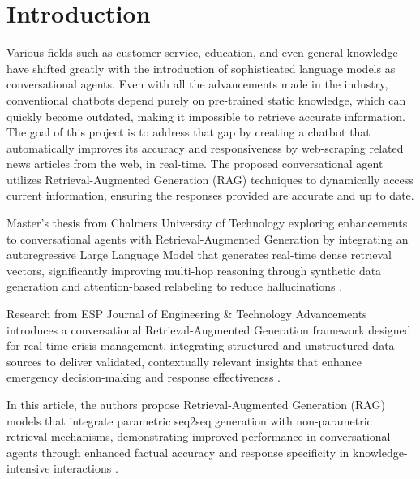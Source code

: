 \documentclass[fleqn,moreauthors,10pt]{ds_report}
\affiliation{\textit{Advisors: Aleš Žagar}}
\begin{document}
\flushbottom 

\maketitle 

\thispagestyle{empty} 


\section*{Introduction}
    Various fields such as customer service, education, and even general knowledge have shifted greatly with the introduction of sophisticated language models as conversational agents. Even with all the advancements made in the industry, conventional chatbots depend purely on pre-trained static knowledge, which can quickly become outdated, making it impossible to retrieve accurate information. The goal of this project is to address that gap by creating a chatbot that automatically improves its accuracy and responsiveness by web-scraping related news articles from the web, in real-time.
    The proposed conversational agent utilizes Retrieval-Augmented Generation (RAG) techniques to dynamically access current information, ensuring the responses provided are accurate and up to date.

    Master's thesis from Chalmers University of Technology exploring enhancements to conversational agents with Retrieval-Augmented Generation by integrating an autoregressive Large Language Model that generates real-time dense retrieval vectors, significantly improving multi-hop reasoning through synthetic data generation and attention-based relabeling to reduce hallucinations \cite{RAG1}.

    Research from ESP Journal of Engineering \& Technology Advancements introduces a conversational Retrieval-Augmented Generation framework designed for real-time crisis management, integrating structured and unstructured data sources to deliver validated, contextually relevant insights that enhance emergency decision-making and response effectiveness \cite{jeta2024}.

    In this article, the authors propose Retrieval-Augmented Generation (RAG) models that integrate parametric seq2seq generation with non-parametric retrieval mechanisms, demonstrating improved performance in conversational agents through enhanced factual accuracy and response specificity in knowledge-intensive interactions \cite{NEURIPS2020_6b493230}.
\end{document}
